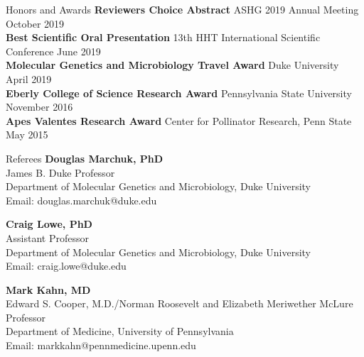 \documentclass{resume} %
\begin{document}
\begin{rSection}{Honors and Awards}
{\bf Reviewers Choice Abstract} ASHG 2019 Annual Meeting \hfill {October 2019} \\ 
{\bf Best Scientific Oral Presentation} 13th HHT International Scientific Conference \hfill {June 2019} \\ 
{\bf Molecular Genetics and Microbiology Travel Award} Duke University \hfill {April 2019} \\ 
{\bf Eberly College of Science Research Award} Pennsylvania State University \hfill {November 2016} \\ 
{\bf Apes Valentes Research Award} Center for Pollinator Research, Penn State \hfill {May 2015} 
\end{rSection}


\begin{rSection}{Referees}
{\bf Douglas Marchuk, PhD}  \\ 
James B. Duke Professor \\
Department of Molecular Genetics and Microbiology, Duke University \\
Email: douglas.marchuk@duke.edu 

{\bf Craig Lowe, PhD} \\ 
Assistant Professor \\
Department of Molecular Genetics and Microbiology, Duke University \\
Email: craig.lowe@duke.edu 

{\bf Mark Kahn, MD} \\ 
Edward S. Cooper, M.D./Norman Roosevelt and Elizabeth Meriwether McLure Professor \\
Department of Medicine, University of Pennsylvania \\
Email: markkahn@pennmedicine.upenn.edu 

\end{rSection}
\end{document}
